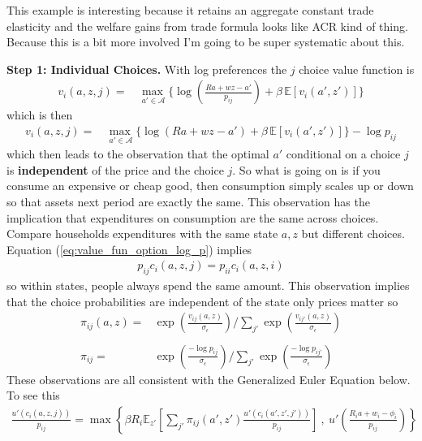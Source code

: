 \documentclass[12pt,pdftex]{article}
\begin{document}
\begin{onehalfspacing}
This example is interesting because it retains an aggregate constant trade elasticity and the welfare gains from trade formula looks like ACR kind of thing. Because this is a bit more involved I'm going to be super systematic about this.

\textbf{Step 1: Individual Choices.} With log preferences the $j$ choice value function is
\begin{align}
v_{i}(a, z, j) = &  \max_{\ a' \in \mathcal{A} }\bigg  \{ \log\left (\frac{Ra + wz - a'}{p_{ij}} \right )  + \beta \, \mathbb{E} [v_{i}(a', z')]  \bigg\}
\end{align}
which is then
\begin{align}
v_{i}(a, z, j) = &  \max_{\ a' \in \mathcal{A} }\bigg  \{ \log(Ra + wz - a' )  + \beta \, \mathbb{E} [v_{i}(a', z' )]  \bigg\} - \log p_{ij}
\label{eq:value_fun_option_log_p}
\end{align}
which then leads to the observation that the optimal $a'$ conditional on a choice $j$ is \textbf{independent} of the price and the choice $j$. So what is going on is if you consume an expensive or cheap good, then consumption simply scales up or down so that assets next period are exactly the same. This observation has the implication that expenditures on consumption are the same across choices. Compare households expenditures with the same state $a,z$ but different choices. Equation (\ref{eq:value_fun_option_log_p}) implies
\begin{align}
p_{ij}c_{i}(a,z,j) = p_{ii}c_{i}(a,z,i)
\label{eq:apx-same-spending}
\end{align}
so within states, people always spend the same amount. This observation implies that the choice probabilities are independent of the state only prices matter so
\begin{align}
\pi_{ij}(a, z) = & \exp \left( \frac{ v_{ij}(a, z) }{\sigma_{\epsilon}} \right) \Bigg / \sum_{j'} \exp \left( \frac{ v_{ij'}(a, z ) }{\sigma_{\epsilon}} \right) \\
\nonumber\\
\pi_{ij} = & \exp \left( \frac{  -\log p_{ij} }{\sigma_{\epsilon}} \right) \Bigg / \sum_{j'} \exp \left( \frac{ -\log p_{ij'} }{\sigma_{\epsilon}} \right) \label{apx-eq:shares}
\end{align}
These observations are all consistent with the Generalized Euler Equation below. To see this
\begin{align}
\frac{u'(c_{i}(a, z, j))}{p_{ij}} = \max \left\{ \beta R_{i} \mathbb{E}_{z'} \left[ \sum_{j'} \pi_{ij}(a', z') \frac{u'(c_{i}(a', z', j'))}{p_{ij}} \right] \ , \  u' \left( \frac{R_i a + w_i - \phi_{i}}{p_{ij}} \right) \right \}

\end{align}
\end{onehalfspacing}
\end{document}
